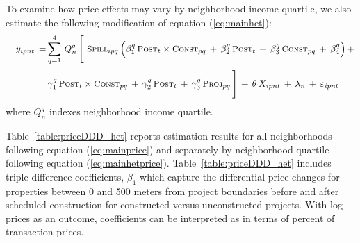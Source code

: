 \documentclass[12pt]{article}
\begin{document}
To examine how price effects may vary by neighborhood income quartile, we also estimate the following modification of equation (\ref{eq:mainhet}):
\begin{align}\label{eq:mainhetprice}
\begin{split}
\quad y_{ipnt} \, =& \sum_{q=1}^{4} \, Q_{n}^{q} \, \Bigg[ \,\, \textsc{\small Spill}_{ipq} \, \Big( \beta_1^q \, \textsc{\small Post}_{t}\times\textsc{\small Const}_{pq} \, + \, \beta_2^q \, \textsc{\small Post}_{t} \, + \, \beta_3^q \, \textsc{\small Const}_{pq} \, +\, \beta_4^q \Big) \, + \\[.2em]
& \, \gamma_1^q \,  \textsc{\small Post}_{t}\times\textsc{\small Const}_{pq} \, + \, \gamma_2^q \,\textsc{\small Post}_{t} \, + \, \gamma_3^q \,  \textsc{\small Proj}_{pq} \, \Bigg] \, + \, \theta \, X_{ipnt} \, + \, \lambda_n \, + \, \varepsilon_{ipnt} \quad 
\end{split}
\end{align}
\noindent where $Q_n^q$ indexes neighborhood income quartile.  

Table~\ref{table:priceDDD_het} reports estimation results for all neighborhoods following equation (\ref{eq:mainprice}) and separately by neighborhood quartile following equation (\ref{eq:mainhetprice}).  Table~\ref{table:priceDDD_het} includes triple difference coefficients, $\beta_1$ which capture the differential price changes for properties between 0 and 500 meters from project boundaries before and after scheduled construction for constructed versus unconstructed projects.  With log-prices as an outcome, coefficients can be interpreted as in terms of percent of transaction prices.
\end{document}
